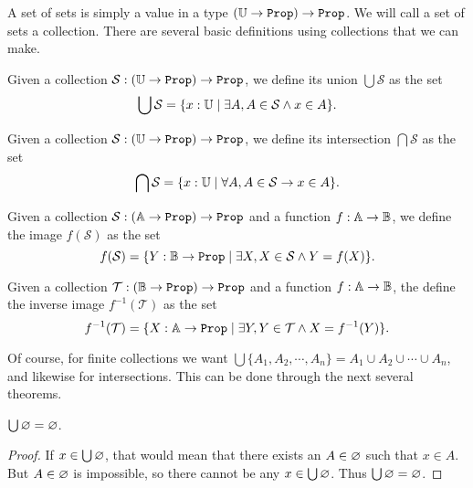 \documentclass[../math.tex]{subfiles}
\begin{document}
A set of sets is simply a value in a type $(\U \rightarrow \Prop) \rightarrow
\Prop$.  We will call a set of sets a collection.  There are several basic
definitions using collections that we can make.

\begin{definition}
    Given a collection $\mathcal S : (\U \rightarrow \Prop) \rightarrow \Prop$,
    we define its union $\bigcup \mathcal S$ as the set
    \[
        \bigcup \mathcal S =
            \{x : \mathbb{U} \mid \exists A, A \in \mathcal S \wedge x \in A\}.
    \]
\end{definition}

\begin{definition}
    Given a collection $\mathcal S : (\U \rightarrow \Prop) \rightarrow \Prop$,
    we define its intersection $\bigcap \mathcal S$ as the set
    \[
        \bigcap \mathcal S =
            \{x : \mathbb{U} \mid \forall A, A \in \mathcal S \rightarrow x \in A\}.
    \]
\end{definition}

\begin{definition}
    Given a collection $\mathcal S : (\A \rightarrow \Prop) \rightarrow \Prop$
    and a function $f : \mathbb{A} \rightarrow \mathbb{B}$, we define the image $f(\mathcal S)$
    as the set
    \[
        f(\mathcal S) =
            \{Y : \B \rightarrow \Prop \mid
            \exists X, X \in \mathcal S \wedge Y = f(X)\}.
    \]
\end{definition}

\begin{definition}
    Given a collection $\mathcal T : (\B \rightarrow \Prop) \rightarrow \Prop$
    and a function $f : \mathbb{A} \rightarrow \mathbb{B}$, the define the inverse image
    $f^{-1}(\mathcal T)$ as the set
    \[
        f^{-1}(\mathcal T) =
            \{X : \A \rightarrow \Prop \mid
            \exists Y, Y \in \mathcal T \wedge X = f^{-1}(Y)\}.
    \]
\end{definition}

Of course, for finite collections we want $\bigcup\{A_1, A_2, \cdots, A_n\} =
A_1 \cup A_2 \cup \cdots \cup A_n$, and likewise for intersections.  This can be
done through the next several theorems.

\begin{theorem}
    $\bigcup \varnothing = \varnothing$.
\end{theorem}
\begin{proof}
    If $x \in \bigcup \varnothing$, that would mean that there exists an $A \in
    \varnothing$ such that $x \in A$.  But $A \in \varnothing$ is impossible, so there
    cannot be any $x \in \bigcup \varnothing$.  Thus $\bigcup \varnothing = \varnothing$.
\end{proof}
\end{document}
